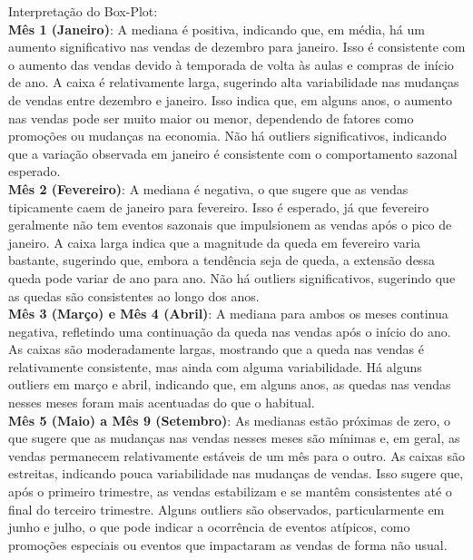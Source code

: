 \documentclass[a4paper, 12pt]{article}
\begin{document}
Interpretação do Box-Plot:\\

\textbf{Mês 1 (Janeiro)}:  A mediana é positiva, indicando que, em média, há um aumento significativo nas vendas de dezembro para janeiro. Isso é consistente com o aumento das vendas devido à temporada de volta às aulas e compras de início de ano.
 A caixa é relativamente larga, sugerindo alta variabilidade nas mudanças de vendas entre dezembro e janeiro. Isso indica que, em alguns anos, o aumento nas vendas pode ser muito maior ou menor, dependendo de fatores como promoções ou mudanças na economia. Não há outliers significativos, indicando que a variação observada em janeiro é consistente com o comportamento sazonal esperado.\\

\textbf{Mês 2 (Fevereiro)}: A mediana é negativa, o que sugere que as vendas tipicamente caem de janeiro para fevereiro. Isso é esperado, já que fevereiro geralmente não tem eventos sazonais que impulsionem as vendas após o pico de janeiro. A caixa larga indica que a magnitude da queda em fevereiro varia bastante, sugerindo que, embora a tendência seja de queda, a extensão dessa queda pode variar de ano para ano.
Não há outliers significativos, sugerindo que as quedas são consistentes ao longo dos anos.\\

\textbf{Mês 3 (Março) e Mês 4 (Abril)}: A mediana para ambos os meses continua negativa, refletindo uma continuação da queda nas vendas após o início do ano.
As caixas são moderadamente largas, mostrando que a queda nas vendas é relativamente consistente, mas ainda com alguma variabilidade.
 Há alguns outliers em março e abril, indicando que, em alguns anos, as quedas nas vendas nesses meses foram mais acentuadas do que o habitual.\\

\textbf{Mês 5 (Maio) a Mês 9 (Setembro)}:  As medianas estão próximas de zero, o que sugere que as mudanças nas vendas nesses meses são mínimas e, em geral, as vendas permanecem relativamente estáveis de um mês para o outro. As caixas são estreitas, indicando pouca variabilidade nas mudanças de vendas. Isso sugere que, após o primeiro trimestre, as vendas estabilizam e se mantêm consistentes até o final do terceiro trimestre. Alguns outliers são observados, particularmente em junho e julho, o que pode indicar a ocorrência de eventos atípicos, como promoções especiais ou eventos que impactaram as vendas de forma não usual.\\
\end{document}
